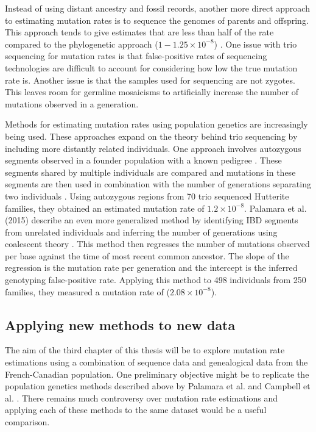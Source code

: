 \documentclass[
11pt, %
oneside, %
english, %
doublespacing, %
headsepline, %
chapterinoneline, %
]{MastersDoctoralThesis} %
\begin{document}
Instead of using distant ancestry and fossil records, another more direct approach to estimating mutation rates is to sequence the genomes of parents and offspring. 
This approach tends to give estimates that are less than half of the rate compared to the phylogenetic approach ($1-1.25\times10^{-8}$) \citep{Shendure2015,Narasimhan2016}.
One issue with trio sequencing for mutation rates is that false-positive rates of sequencing technologies are difficult to account for considering how low the true mutation rate is.
Another issue is that the samples used for sequencing are not zygotes.
This leaves room for germline mosaicisms to artificially increase the number of mutations observed in a generation.

Methods for estimating mutation rates using population genetics are increasingly being used.
These approaches expand on the theory behind trio sequencing by including more distantly related individuals.
One approach involves autozygous segments observed in a founder population with a known pedigree \citep{Campbell2012}.
These segments shared by multiple individuals are compared and mutations in these segments are then used in combination with the number of generations separating two individuals \citep{Campbell2012}.
Using autozygous regions from 70 trio sequenced Hutterite families, they obtained an estimated mutation rate of $1.2\times10^{-8}$.
Palamara et al. (2015) describe an even more generalized method by identifying IBD segments from unrelated individuals and inferring the number of generations using coalescent theory \citep{Palamara2015,Baharian2016}.
This method then regresses the number of mutations observed per base against the time of most recent common ancestor.
The slope of the regression is the mutation rate per generation and the intercept is the inferred genotyping false-positive rate.
Applying this method to 498 individuals from 250 families, they measured a mutation rate of ($2.08\times10^{-8}$).

\subsection{Applying new methods to new data}
The aim of the third chapter of this thesis will be to explore mutation rate estimations using a combination of sequence data and genealogical data from the French-Canadian population.
One preliminary objective might be to replicate the population genetics methods described above by Palamara et al. and Campbell et al. \citep{Palamara2015,Campbell2012}.
There remains much controversy over mutation rate estimations and applying each of these methods to the same dataset would be a useful comparison.
\end{document}
